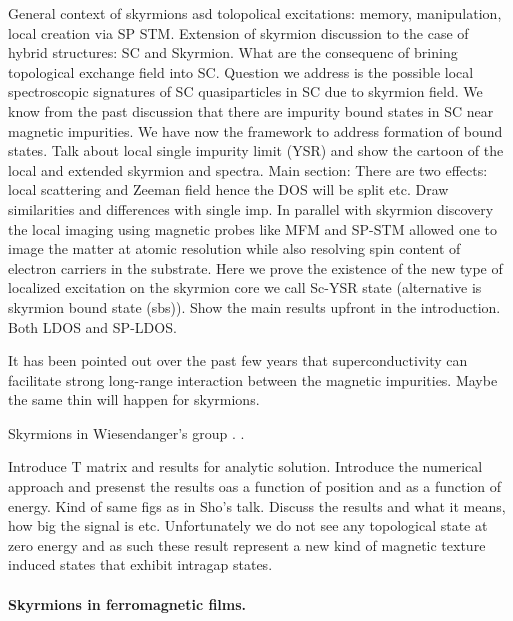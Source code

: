 \documentclass[twocolumn,showpacs,floatfix,nofootinbib,longbibliography]{revtex4-1}
\begin{document}
General context of skyrmions asd tolopolical excitations: memory, manipulation, local creation via SP STM.
Extension of skyrmion discussion to the case of hybrid structures: SC and Skyrmion. What are the consequenc of brining topological exchange field into SC. Question we address is the possible local spectroscopic signatures of SC quasiparticles in SC due to skyrmion field. We know from the past discussion that there are impurity bound states in SC near magnetic impurities. We have now the framework to address formation of bound states. Talk about local single impurity limit (YSR) and show the cartoon of the local and extended skyrmion and spectra. 
Main section: 
There are two effects: local scattering and Zeeman field hence the DOS will be split etc.  Draw similarities and differences with single imp.
In parallel with skyrmion discovery the local imaging using magnetic probes like MFM and SP-STM allowed one to image the matter at atomic resolution while also resolving spin content of electron carriers in the substrate.  
Here we prove the existence of the new type of localized excitation on the skyrmion core we call  Sc-YSR state (alternative is skyrmion bound state (sbs)).  Show the main results upfront in the introduction. Both LDOS and SP-LDOS. 


It has been pointed out over the past few years \cite{Yao2014,Menard2015} that superconductivity can facilitate strong long-range interaction between the magnetic impurities. Maybe the same thin will happen for skyrmions. 

Skyrmions in Wiesendanger's group \cite{Heinze2011,Romming2013,Bergmann2014,Brede2014,Sonntag2014,vonBergmann2015,Romming2015}.
.


Introduce T matrix and results for analytic solution.  
Introduce the numerical approach and presenst the results oas a function of position and as a function of energy. Kind of same figs as in Sho’s talk. 
Discuss the results and what it means, how big the signal is etc. Unfortunately we do not see any topological state at zero energy and as such these result represent a new kind of magnetic texture induced states that exhibit intragap states.



\paragraph*{Skyrmions in ferromagnetic films.} \label{sec:skyrmion}
\end{document}
